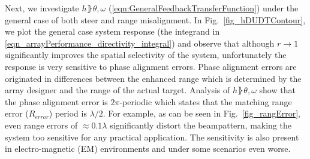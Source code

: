 \documentclass[journal]{IEEEtran}
\begin{document}
\par Next, we investigate $h\rBrace{\theta,\omega}$ (\ref{eqn:GeneralFeedbackTransferFunction}) under the general case of both steer and range misalignment. In Fig.~\ref{fig_hDUDTContour}, we plot the general case system response (the integrand in \ref{eqn_arrayPerformance_directivity_integral}) and observe that although $r\to1$ significantly improves the spatial selectivity of the system, unfortunately the response is very sensitive to phase alignment errors. Phase alignment errors are originated in differences between the enhanced range which is determined by the array designer and the range of the actual target. Analysis of $h\rBrace{\theta,\omega}$ show that the phase alignment error is $2\pi$-periodic which states that the matching range error ($R_{error}$) period is $\lambda/2$. For example, as can be seen in Fig.~\ref{fig_rangError}, even range errors of $\approx0.1\lambda$ significantly distort the beampattern, making the system too sensitive for any practical application. The sensitivity is also present in electro-magnetic (EM) environments and under some scenarios even worse.
\end{document}
